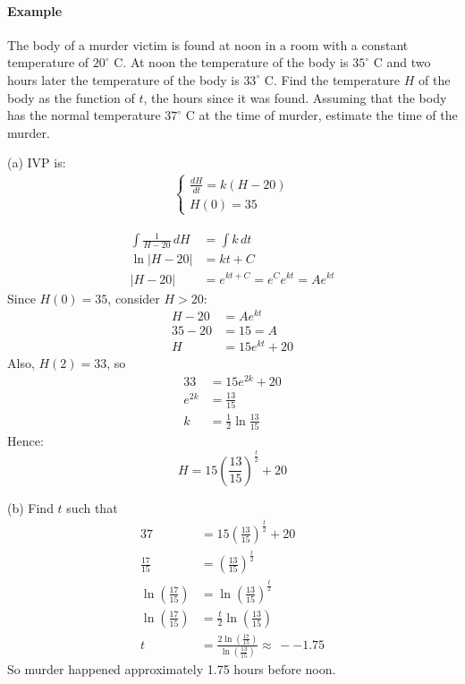 \documentclass[12pt]{article}
\begin{document}
\paragraph{Example}
The body of a murder victim is found at noon in a room with a constant temperature of $20^{\circ}$ C. At noon
the temperature of the body is $35^{\circ}$ C and two hours later the temperature of the body is $33^{\circ}$ C.
Find the temperature $H$ of the body as the function of $t$, the hours since it was found. Assuming that the
body has the normal temperature $37^{\circ}$ C at the time of murder, estimate the time of the murder.

\noindent 
(a) IVP is:
\begin{align*} 
    \begin{cases} 
        \frac{dH}{dt} = k(H - 20) \\
        H(0) = 35
    \end{cases} 
\end{align*}

\begin{align*} 
    \int \frac{1}{H - 20} \, dH &= \int k \, dt \\
    \ln |H - 20| &= kt + C \\
    |H - 20| &= e^{kt + C} = e^Ce^{kt} = Ae^{kt}
\end{align*}
Since $H(0) = 35$, consider $H > 20$:
\begin{align*} 
    H - 20 &= Ae^{kt} \\
    35 - 20 &= 15 = A \\
    H &= 15e^{kt} + 20
\end{align*}
Also, $H(2) = 33$, so
\begin{align*} 
    33 &= 15e^{2k} + 20 \\
    e^{2k} &= \frac{13}{15} \\
    k &= \frac{1}{2} \ln \frac{13}{15}
\end{align*}
Hence:
\[
    H = 15\left(\frac{13}{15}\right)^{\frac{t}{2}} + 20
\]

\noindent
(b) Find $t$ such that
\begin{align*} 
    37 &= 15\left(\frac{13}{15}\right)^{\frac{t}{2}} + 20 \\
    \frac{17}{15} &= \left(\frac{13}{15}\right)^{\frac{t}{2}} \\
    \ln \left( \frac{17}{15} \right) &= \ln \left(\frac{13}{15}\right)^{\frac{t}{2}} \\
    \ln \left( \frac{17}{15} \right) &= \frac{t}{2} \ln \left(\frac{13}{15}\right) \\
    t &= \frac{2 \ln (\frac{17}{15})}{\ln(\frac{13}{15})} \approx\, - - 1.75
\end{align*}
So murder happened approximately 1.75 hours before noon.
\end{document}
